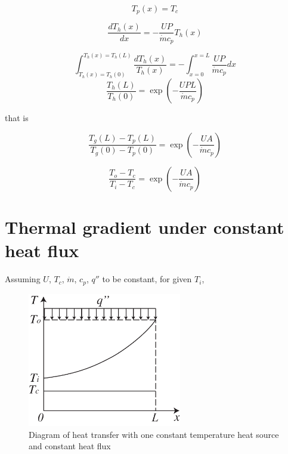 \begin{equation}
T_{p}(x)=T_{c}
\end{equation}

\begin{equation}
\frac{dT_{h}(x)}{dx}=-\frac{UP}{\dot{m}c_{p}}T_{h}(x)\label{eq:T_h(x)}
\end{equation}

\begin{equation}
\int_{T_{h}(x)=T_{h}(0)}^{T_{h}(x)=T_{h}(L)}\frac{dT_{h}(x)}{T_{h}(x)}=-\int_{x=0}^{x=L}\frac{UP}{\dot{m}c_{p}}dx
\end{equation}
\begin{equation}
\frac{T_{h}(L)}{T_{h}(0)}=\exp(-\frac{UPL}{\dot{m}c_{p}})
\end{equation}

that is

\begin{equation}
\frac{T_{g}(L)-T_{p}(L)}{T_{g}(0)-T_{p}(0)}=\exp(-\frac{UA}{\dot{m}c_{p}})
\end{equation}

\begin{equation}
\frac{T_{o}-T_{c}}{T_{i}-T_{c}}=\exp(-\frac{UA}{\dot{m}c_{p}})
\label{eq:Eq}
\end{equation}

\chapter{Thermal gradient under constant heat flux}\label{cha:CTCHFHX}

Assuming $U$, $T_{c}$, $\dot{m}$, $c_p$, $q''$ to be constant, for
given $T_{i}$,

\noindent \begin{center}
\begin{figure}[h]
\noindent \begin{centering}
\includegraphics[width=0.6\textwidth]{fig/CTCHFHX.pdf}\caption{Diagram of heat transfer with one constant temperature
heat source and constant heat flux}
\label{fig:CTCHFHX}
\par\end{centering}
\end{figure}
\par\end{center}

